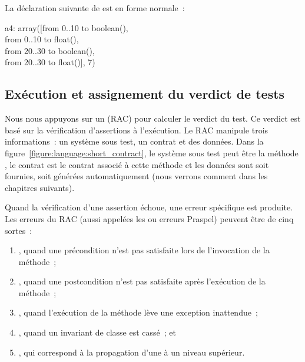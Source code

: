 \begin{example}

La déclaration suivante de  est en forme normale~:

\begin{pre}
a4: array([from  0..10 to boolean(), \\
           from  0..10 to float(), \\
           from 20..30 to boolean(), \\
           from 20..30 to float()], 7)
\end{pre}

\end{example}

\subsection{Exécution et assignement du verdict de tests}
\label{subsection:language:verdict}

Nous nous appuyons sur un  (RAC) pour
calculer le verdict du test. Ce verdict est basé sur la vérification
d'assertions à l'exécution. Le RAC manipule trois informations~: un système sous
test, un contrat et des données. Dans la
figure~\ref{figure:language:short_contract}, le système sous test peut être la
méthode , le contrat est le contrat associé à cette méthode et les
données sont soit fournies, soit générées automatiquement (nous verrons comment
dans les chapitres suivants).

Quand la vérification d'une assertion échoue, une erreur spécifique est
produite. Les erreurs du RAC (aussi appelées les 
ou erreurs Praspel) peuvent être de cinq sortes~:

\begin{enumerate}

\item {}, quand une précondition n'est pas
satisfaite lors de l'invocation de la méthode~;

\item {}, quand une postcondition n'est pas
satisfaite après l'exécution de la méthode~;

\item {}, quand l'exécution de la méthode lève une
exception inattendue~;

\item {}, quand un invariant de classe est cassé~; et

\item {}, qui correspond à la propagation
d'une  à un niveau supérieur.

\end{enumerate}

